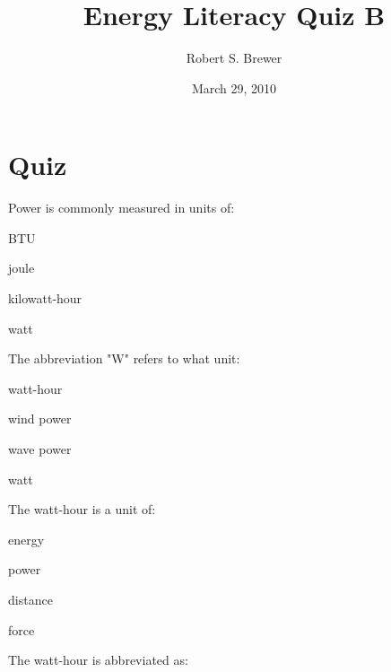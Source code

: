 \documentclass[11pt]{article}
\begin{document}
\title{Energy Literacy Quiz B}
\author{Robert S. Brewer}
\date{March 29, 2010}

\maketitle


\section{Quiz}

\begin{question}
	\item Power is commonly measured in units of:
\end{question}

\begin{answer}
	\item BTU
	\item joule
	\item kilowatt-hour
	\item watt
\end{answer}

\begin{question}
	\item The abbreviation "W" refers to what unit:
\end{question}

\begin{answer}
	\item watt-hour
	\item wind power
	\item wave power
	\item watt
\end{answer}

\begin{question}
	\item The watt-hour is a unit of:
\end{question}

\begin{answer}
	\item energy
	\item power
	\item distance
	\item force
\end{answer}

\begin{question}
	\item The watt-hour is abbreviated as:
\end{question}
\end{document}
